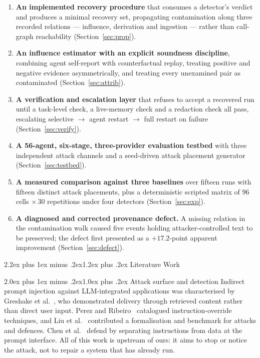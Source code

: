 \documentclass[10pt,twocolumn,a4paper]{article}
\makeatletter
\renewcommand{\section}{\@startsection{section}{1}{\z@}%
  {2.2ex plus 1ex minus .2ex}{1.2ex plus .2ex}%
  {\centering\normalfont\normalsize\scshape}}
\renewcommand{\subsection}{\@startsection{subsection}{2}{\z@}%
  {2.0ex plus 1ex minus .2ex}{1.0ex plus .2ex}%
  {\normalfont\normalsize\itshape}}
\makeatother
\begin{document}
\begin{enumerate}
\item \textbf{An implemented recovery procedure} that consumes a detector's
verdict and produces a minimal recovery set, propagating contamination along
three recorded relations --- influence, derivation and ingestion --- rather
than call-graph reachability (Section~\ref{sec:prop}).

\item \textbf{An influence estimator with an explicit soundness discipline},
combining agent self-report with counterfactual replay, treating positive and
negative evidence asymmetrically, and treating every unexamined pair as
contaminated (Section~\ref{sec:attrib}).

\item \textbf{A verification and escalation layer} that refuses to accept a
recovered run until a task-level check, a live-memory check and a redaction
check all pass, escalating selective $\rightarrow$ agent restart $\rightarrow$
full restart on failure (Section~\ref{sec:verify}).

\item \textbf{A 56-agent, six-stage, three-provider evaluation testbed} with
three independent attack channels and a seed-driven attack placement generator
(Section~\ref{sec:testbed}).

\item \textbf{A measured comparison against three baselines} over fifteen runs
with fifteen distinct attack placements, plus a deterministic scripted matrix of
$96$ cells $\times\,30$ repetitions under four detectors
(Section~\ref{sec:exp}).

\item \textbf{A diagnosed and corrected provenance defect.} A missing relation
in the contamination walk caused five events holding attacker-controlled text
to be preserved; the defect first presented as a $+17.2$-point apparent
improvement (Section~\ref{sec:defect}).
\end{enumerate}

\section{Literature Work}
\label{sec:lit}

\subsection{Attack surface and detection}
Indirect prompt injection against LLM-integrated applications was characterised
by Greshake et al.~\cite{greshake2023}, who demonstrated delivery through
retrieved content rather than direct user input. Perez and
Ribeiro~\cite{perez2022} catalogued instruction-override techniques, and Liu et
al.~\cite{liu2024} contributed a formalisation and benchmark for attacks and
defences. Chen et al.~\cite{chen2024} defend by separating instructions from
data at the prompt interface. All of this work is upstream of ours: it aims to
stop or notice the attack, not to repair a system that has already run.
\end{document}
